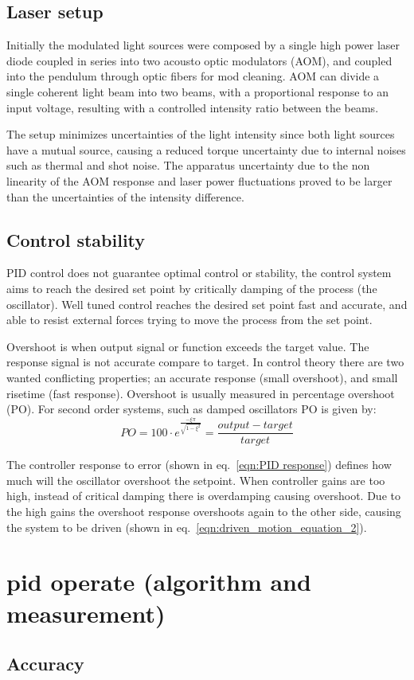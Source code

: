 \documentclass[\main/master.tex]{subfiles}
\begin{document}
\subsection{Laser setup}
Initially the modulated light sources were composed by a single high power laser diode coupled in series into two acousto optic modulators (AOM), and coupled into the pendulum through optic fibers for mod cleaning. AOM can divide a single coherent light beam into two beams, with a proportional response to an input voltage, resulting with a controlled intensity ratio between the beams.
\par\noindent
The setup minimizes uncertainties of the light intensity since both light sources have a mutual source, causing a reduced torque uncertainty due to internal noises such as thermal and shot noise. The apparatus uncertainty due to the non linearity of the AOM response and laser power fluctuations proved to be larger than the uncertainties of the intensity difference.   


\subsection{Control stability}
PID control does not guarantee optimal control or stability, the control system aims to reach the desired set point by critically damping of the process (the oscillator). Well tuned control reaches the desired set point fast and accurate, and able to resist external forces trying to move the process from the set point.
\par\noindent
Overshoot is when output signal or function exceeds the target value. The response signal is not accurate compare to target. In control theory there are two wanted conflicting properties; an accurate response (small overshoot), and small risetime (fast response). Overshoot is usually measured in percentage overshoot (PO). For second order systems, such as damped oscillators PO is given by:
\begin{equation}
PO = 100\cdot e ^{\frac{-\xi\pi}{\sqrt{1-\xi^2}}} = \frac{output-target}{target}   \label{eqn:percentage_overshoot}
\end{equation}
\par\noindent
The controller response to error (shown in eq.~\ref{eqn:PID response}) defines how much will the oscillator overshoot the setpoint. When controller gains  are too high, instead of critical damping there is overdamping causing overshoot. Due to the high gains the overshoot response overshoots again to the other side, causing the system to be driven (shown in eq.~\ref{eqn:driven_motion_equation_2}).

\section{pid operate (algorithm and measurement)}
\subsection{Accuracy}
\end{document}
